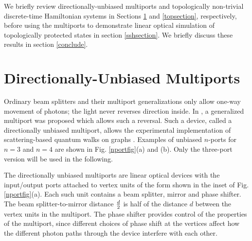 \documentclass[twocolumn,amsmath, amssymb, superscriptaddress, pra]{revtex4}
\begin{document}
We briefly review directionally-unbiased multiports and topologically non-trivial discrete-time Hamiltonian systems in Sections \ref{unbiased} and
\ref{topsection}, respectively, before using the multiports to demonstrate linear optical simulation of topologically protected states in section
\ref{sshsection}. We briefly discuss these results in section \ref{conclude}.





\section{Directionally-Unbiased Multiports}\label{unbiased}

Ordinary beam splitters and their multiport generalizations only allow
one-way movement of photons; the light never reverses direction inside. In
\cite{threeport}, a generalized multiport was proposed which allows such a
reversal. Such a device, called a directionally unbiased multiport, allows
the experimental implementation of scattering-based quantum walks on graphs
\cite{fh1,fh2,fh3}. Examples of unbiased $n$-ports for $n=3$ and $n=4$ are
shown in Fig. \ref{nportfig}(a) and (b). Only the three-port version will be
used in the following.

The directionally unbiased multiports are linear optical devices with the
input/output ports attached to vertex units of the form shown in the inset of
Fig. \ref{nportfig}(a). Each such unit contains a  beam splitter, mirror and
phase shifter.  The beam splitter-to-mirror distance ${d\over 2}$ is half of
the distance $d$ between the vertex units in the multiport. The phase shifter
provides control of the properties of the multiport, since different choices
of phase shift at the vertices affect how the different photon paths through
the device interfere with each other.
\end{document}
